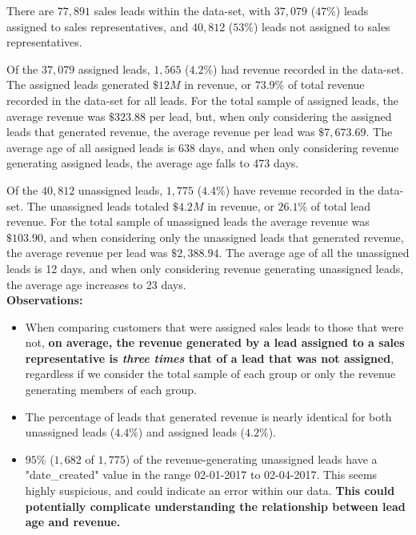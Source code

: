 \documentclass[11pt]{article}
\begin{document}
There are $77,891$ sales leads within the data-set, with $37,079$ ($47\%$) leads assigned to sales representatives, and $40,812$ ($53\%$) leads not assigned to sales representatives. 
\par Of the $37,079$  assigned leads, $1,565$ ($4.2\%$) had revenue recorded in the data-set. The assigned leads generated $\$12M$ in revenue, or $73.9\%$ of total revenue recorded in the data-set for all leads. For the total sample of assigned leads, the average revenue was $\$323.88$ per lead, but, when only considering the assigned leads that generated revenue, the average revenue per lead was $\$7,673.69$. The average age of all assigned leads is 638 days, and when only considering revenue generating assigned leads, the average age falls to 473 days.

Of the $40,812$ unassigned leads, $1,775$ ($4.4\%$) have revenue recorded in the data-set. The unassigned leads totaled $\$4.2M$ in revenue, or $26.1\%$ of total lead revenue. For the total sample of unassigned leads the average revenue was $\$103.90$, and when considering only the unassigned leads that generated revenue, the average revenue per lead was $\$2,388.94$. The average age of all the unassigned leads is 12 days, and when only considering revenue generating unassigned leads, the average age increases to 23 days. \\

\textbf{Observations:}
\begin{itemize}
    \item When comparing customers that were assigned sales leads to those that were not, \textbf{on average, the revenue generated by a lead assigned to a sales representative is \textit{three times} that of a lead that was not assigned}, regardless if we consider the total sample of each group or only the revenue generating members of each group. 
    \item The percentage of leads that generated revenue is nearly identical for both unassigned leads ($4.4\%$) and assigned leads ($4.2\%$).
    \item $95\%$ ($1,682$ of $1,775$) of the revenue-generating unassigned leads have a "date\_created" value in the range 02-01-2017 to 02-04-2017. This seems highly suspicious, and could indicate an error within our data. \textbf{This could potentially complicate understanding the relationship between lead age and revenue.} 
\end{itemize}
\end{document}
